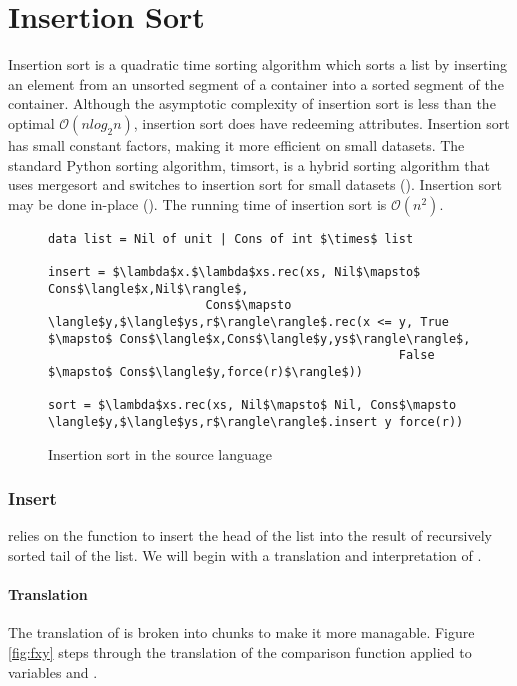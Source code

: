 \chapter{Insertion Sort}
%
Insertion sort is a quadratic time sorting algorithm which sorts a list by inserting an element from an unsorted segment of a container into a sorted segment of the container.
Although the asymptotic complexity of insertion sort is less than the optimal $\mathcal{O}(nlog_2n)$, insertion sort does have redeeming attributes. 
Insertion sort has small constant factors, making it more efficient on small datasets. 
The standard Python sorting algorithm, timsort, is a hybrid sorting algorithm that uses mergesort and switches to insertion sort for small datasets (\citet{cpython}).
Insertion sort may be done in-place (\citet{Cormen2001}).
The running time of insertion sort is $\mathcal{O}(n^2)$.

\begin{figure}[H]
\caption{Insertion sort in the source language}
\begin{lstlisting}
data list = Nil of unit | Cons of int $\times$ list

insert = $\lambda$x.$\lambda$xs.rec(xs, Nil$\mapsto$ Cons$\langle$x,Nil$\rangle$,
                      Cons$\mapsto \langle$y,$\langle$ys,r$\rangle\rangle$.rec(x <= y, True $\mapsto$ Cons$\langle$x,Cons$\langle$y,ys$\rangle\rangle$,
                                                 False $\mapsto$ Cons$\langle$y,force(r)$\rangle$))

sort = $\lambda$xs.rec(xs, Nil$\mapsto$ Nil, Cons$\mapsto \langle$y,$\langle$ys,r$\rangle\rangle$.insert y force(r))
\end{lstlisting}
\end{figure}

\subsection{Insert}
 relies on the function  to insert the head of the list into the result of recursively sorted tail of the list.
We will begin with a translation and interpretation of .

\subsubsection{Translation}
The translation of  is broken into chunks to make it more managable.
Figure \ref{fig:fxy} steps through the translation of the comparison function \T{<=} applied to variables  and .

